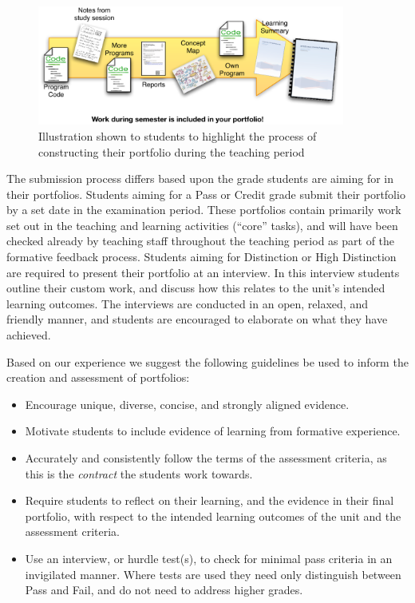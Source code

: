 \begin{figure}[p]
	\centering
	\includegraphics[width=0.9\textwidth]{PortfolioPieces}
	\caption{Illustration shown to students to highlight the process of constructing their portfolio during the teaching period}
	\label{fig:portfolio_pieces}
\end{figure}

The submission process differs based upon the grade students are aiming for in their portfolios. Students aiming for a Pass or Credit grade submit their portfolio by a set date in the examination period. These portfolios contain primarily work set out in the teaching and learning activities (``core'' tasks), and will have been checked already by teaching staff throughout the teaching period as part of the formative feedback process. Students aiming for Distinction or High Distinction are required to present their portfolio at an interview. In this interview students outline their custom work, and discuss how this relates to the unit's intended learning outcomes. The interviews are conducted in an open, relaxed, and friendly manner, and students are encouraged to elaborate on what they have achieved.

\clearpage
Based on our experience we suggest the following guidelines be used to inform the creation and assessment of portfolios:

%
% 

\begin{itemize}[noitemsep,nolistsep]
  \item Encourage unique, diverse, concise, and strongly aligned evidence.
  \item Motivate students to include evidence of learning from formative experience.
  \item Accurately and consistently follow the terms of the assessment criteria, as this is the \emph{contract} the students work towards.
  \item Require students to reflect on their learning, and the evidence in their final portfolio, with respect to the intended learning outcomes of the unit and the assessment criteria.
  \item Use an interview, or hurdle test(s), to check for minimal pass criteria in an invigilated manner. Where tests are used they need only distinguish between Pass and Fail, and do not need to address higher grades. 
\end{itemize}

